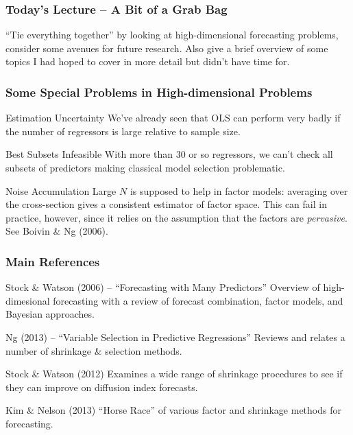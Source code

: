 \documentclass[handout]{beamer}
\begin{document}
\begin{frame}[c]\frametitle{Today's Lecture -- A Bit of a Grab Bag}
    
``Tie everything together'' by looking at high-dimensional forecasting problems, consider some avenues for future research. Also give a brief overview of some topics I had hoped to cover in more detail but didn't have time for.

\end{frame}

\begin{frame}[c]\frametitle{Some Special Problems in High-dimensional Problems}
    

\begin{block}
	{Estimation Uncertainty} 
	We've already seen that OLS can perform very badly if the number of regressors is large relative to sample size.
\end{block}

\begin{block}
	{Best Subsets Infeasible}
	With more than 30 or so regressors, we can't check all subsets of predictors making classical model selection problematic.
\end{block}

\begin{block}
	{Noise Accumulation} 
	Large $N$ is supposed to help in factor models: averaging over the cross-section gives a consistent estimator of factor space. This can fail in practice, however, since it relies on the assumption that the factors are \emph{pervasive}. See Boivin \& Ng (2006).
\end{block}


\end{frame}
\begin{frame}
	\frametitle{Main References}
	\begin{block}
		{Stock \& Watson (2006) -- ``Forecasting with Many Predictors''} Overview of high-dimesional forecasting with a review of forecast combination, factor models, and Bayesian approaches.
	\end{block}
	\begin{block}
		{Ng (2013) -- ``Variable Selection in Predictive Regressions''}
		Reviews and relates a number of shrinkage \& selection methods.
	\end{block}
	\begin{block}
		{Stock \& Watson (2012)}
		Examines a wide range of shrinkage procedures to see if they can improve on diffusion index forecasts.
	\end{block}
	\begin{block}
		{Kim \& Nelson (2013)}
		``Horse Race'' of various factor and shrinkage methods for forecasting.
	\end{block}
\end{frame}
\end{document}
